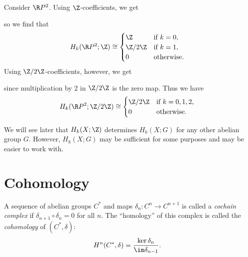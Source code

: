 \begin{example}
  Consider $\R P^2$. Using $\Z$-coefficients,
  we get
  \begin{center}
  \end{center}
  so we find that
  \[
    H_k(\R P^2; \Z) \cong
    \begin{cases}
      \Z & \text{if $k = 0$}, \\
      \Z / 2\Z & \text{if $k = 1$}, \\
      0 & \text{otherwise}.
    \end{cases}
  \]
  Using $\Z / 2\Z$-coefficients, however, we get
  \begin{center}
  \end{center}
  since multiplication by $2$ in $\Z / 2\Z$ is
  the zero map. Thus we have
  \[
    H_k(\R P^2; \Z / 2\Z)
    \cong
    \begin{cases}
      \Z / 2\Z & \text{if $k = 0, 1, 2$}, \\
      0 & \text{otherwise}.
    \end{cases}
  \]
\end{example}

\begin{remark}
  We will see later that $H_k(X; \Z)$ determines
  $H_k(X; G)$ for any other abelian group $G$.
  However, $H_k(X; G)$ may be sufficient for
  some purposes and may be easier to work
  with.
\end{remark}

\section{Cohomology}

\begin{definition}
  A sequence of abelian groups $C^*$ and maps
  $\delta_n : C^n \to C^{n + 1}$ is called a
  \emph{cochain complex} if $\delta_{n + 1} \circ \delta_n = 0$
  for all $n$. The ``homology'' of this complex
  is called the \emph{cohomology} of
  $(C^*, \delta)$:
  \[
    H^n(C^*, \delta) = \frac{\ker \delta_n}{\im \delta_{n - 1}}.
  \]
\end{definition}

